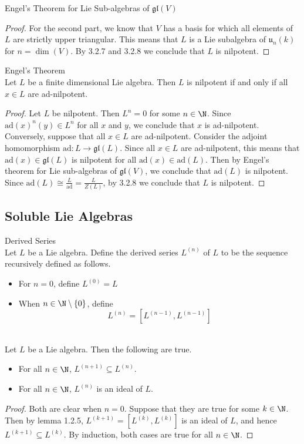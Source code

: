 \documentclass[a4paper]{article}
\begin{document}
\begin{prp}{Engel's Theorem for Lie Sub-algebras of $\mathfrak{gl}(V)$}{}
\begin{proof}
For the second part, we know that $V$ has a basis for which all elements of $L$ are strictly upper triangular. This means that $L$ is a Lie subalgebra of $\mathfrak{u}_n(k)$ for $n=\dim(V)$. By 3.2.7 and 3.2.8 we conclude that $L$ is nilpotent. 
\end{proof}
\end{prp}

\begin{thm}{Engel's Theorem}{} \\Let $L$ be a finite dimensional Lie algebra. Then $L$ is nilpotent if and only if all $x\in L$ are ad-nilpotent. 
\begin{proof}
Let $L$ be nilpotent. Then $L^n=0$ for some $n\in\N$. Since $\text{ad}(x)^n(y)\in L^n$ for all $x$ and $y$, we conclude that $x$ is ad-nilpotent. \\

Conversely, suppose that all $x\in L$ are ad-nilpotent. Consider the adjoint homomorphism $\text{ad}:L\to\mathfrak{gl}(L)$. Since all $x\in L$ are ad-nilpotent, this means that $\text{ad}(x)\in\mathfrak{gl}(L)$ is nilpotent for all $\text{ad}(x)\in\text{ad}(L)$. Then by Engel's theorem for Lie sub-algebras of $\mathfrak{gl}(V)$, we conclude that $\text{ad}(L)$ is nilpotent. Since $\text{ad}(L)\cong\frac{L}{\text{ad}}=\frac{L}{Z(L)}$, by 3.2.8 we conclude that $L$ is nilpotent. 
\end{proof}
\end{thm}

\subsection{Soluble Lie Algebras}
\begin{defn}{Derived Series}{} \\Let $L$ be a Lie algebra. Define the derived series $L^{(n)}$ of $L$ to be the sequence recursively defined as follows. 
\begin{itemize}
\item For $n=0$, define $L^{(0)}=L$
\item When $n\in\N\setminus\{0\}$, define $$L^{(n)}=[L^{(n-1)},L^{(n-1)}]$$
\end{itemize}
\end{defn}

\begin{lmm}{}{} \\Let $L$ be a Lie algebra. Then the following are true. 
\begin{itemize}
\item For all $n\in\N$, $L^{(n+1)}\subseteq L^{(n)}$. 
\item For all $n\in\N$, $L^{(n)}$ is an ideal of $L$. 
\end{itemize} 
\begin{proof}
Both are clear when $n=0$. Suppose that they are true for some $k\in\N$. Then by lemma 1.2.5, $L^{(k+1)}=[L^{(k)},L^{(k)}]$ is an ideal of $L$, and hence $L^{(k+1)}\subseteq L^{(k)}$. By induction, both cases are true for all $n\in\N$. 
\end{proof}
\end{lmm}
\end{document}
